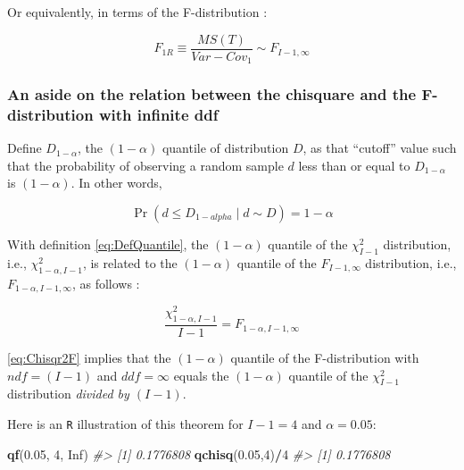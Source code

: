\documentclass[
]{book}
\newenvironment{Shaded}{\begin{snugshade}}{\end{snugshade}}
\newcommand{\CommentTok}[1]{\textcolor[rgb]{0.56,0.35,0.01}{\textit{#1}}}
\newcommand{\DecValTok}[1]{\textcolor[rgb]{0.00,0.00,0.81}{#1}}
\newcommand{\FloatTok}[1]{\textcolor[rgb]{0.00,0.00,0.81}{#1}}
\newcommand{\KeywordTok}[1]{\textcolor[rgb]{0.13,0.29,0.53}{\textbf{#1}}}
\newcommand{\NormalTok}[1]{#1}
\newcommand{\OperatorTok}[1]{\textcolor[rgb]{0.81,0.36,0.00}{\textbf{#1}}}
\newcommand{\OtherTok}[1]{\textcolor[rgb]{0.56,0.35,0.01}{#1}}
\begin{document}
Or equivalently, in terms of the F-distribution \citep{RN1772}:

\begin{equation}
F_{1R} \equiv \frac{MS(T)}{Var-Cov_1} \sim F_{I-1, \infty}
\label{eq:DefF-1RMT}
\end{equation}

\hypertarget{an-aside-on-the-relation-between-the-chisquare-and-the-f-distribution-with-infinite-ddf}{%
\subsubsection{An aside on the relation between the chisquare and the F-distribution with infinite ddf}\label{an-aside-on-the-relation-between-the-chisquare-and-the-f-distribution-with-infinite-ddf}}

Define \(D_{1-\alpha}\), the \((1-\alpha)\) quantile of distribution \(D\), as that ``cutoff'' value such that the probability of observing a random sample \(d\) less than or equal to \(D_{1-\alpha}\) is \((1-\alpha)\). In other words,

\begin{equation}
\Pr(d\leq D_{1-alpha} \mid d \sim D)=1-\alpha
\label{eq:DefQuantile}
\end{equation}

With definition \eqref{eq:DefQuantile}, the \((1-\alpha)\) quantile of the \(\chi_{I-1}^2\) distribution, i.e., \(\chi_{1-\alpha,I-1}^2\), is related to the \((1-\alpha)\) quantile of the \(F_{I-1,\infty}\) distribution, i.e., \(F_{1-\alpha,I-1,\infty}\), as follows \citep[see][Eq. 22]{RN1772}:

\begin{equation}
\frac{\chi_{1-\alpha,I-1}^{2}}{I-1} = F_{1-\alpha,I-1,\infty}
\label{eq:Chisqr2F}
\end{equation}

\eqref{eq:Chisqr2F} implies that the \((1-\alpha)\) quantile of the F-distribution with \(ndf=(I-1)\) and \(ddf=\infty\) equals the \((1-\alpha)\) quantile of the \(\chi_{I-1}^2\) distribution \emph{divided by \((I-1)\)}.

Here is an \texttt{R} illustration of this theorem for \(I-1 = 4\) and \(\alpha = 0.05\):

\begin{Shaded}
\begin{Highlighting}[]
\KeywordTok{qf}\NormalTok{(}\FloatTok{0.05}\NormalTok{, }\DecValTok{4}\NormalTok{, }\OtherTok{Inf}\NormalTok{)}
\CommentTok{\#\textgreater{} [1] 0.1776808}
\KeywordTok{qchisq}\NormalTok{(}\FloatTok{0.05}\NormalTok{,}\DecValTok{4}\NormalTok{)}\OperatorTok{/}\DecValTok{4}
\CommentTok{\#\textgreater{} [1] 0.1776808}
\end{Highlighting}
\end{Shaded}
\end{document}
